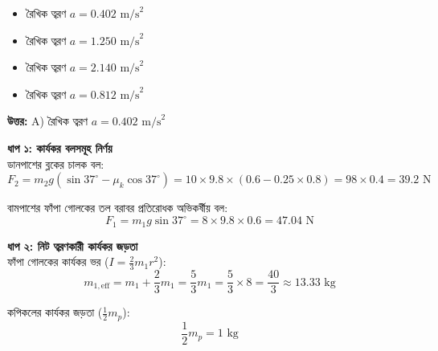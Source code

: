 \documentclass[12pt, a4paper]{article}
\begin{document}
{\begin{center}
\end{center}
\vspace{1em}

\begin{itemize}[label={}, leftmargin=1cm, itemsep=0.5em]
    \item[\textbf{A)}] রৈখিক ত্বরণ $a = 0.402\text{ m/s}^2$
    \item[\textbf{B)}] রৈখিক ত্বরণ $a = 1.250\text{ m/s}^2$
    \item[\textbf{C)}] রৈখিক ত্বরণ $a = 2.140\text{ m/s}^2$
    \item[\textbf{D)}] রৈখিক ত্বরণ $a = 0.812\text{ m/s}^2$
\end{itemize}

\vspace{0.5em}
\begin{tcolorbox}[answerbox]
    \textbf{\color{success} উত্তর:} A) রৈখিক ত্বরণ $a = 0.402\text{ m/s}^2$
\end{tcolorbox}
\vspace{1em}

\begin{tcolorbox}[solutionbox={সমাধান (Solution)}]
    \noindent
    \textbf{ধাপ ১: কার্যকর বলসমূহ নির্ণয়} \\
    ডানপাশের ব্লকের চালক বল:
    \[ F_2 = m_2 g (\sin 37^\circ - \mu_k \cos 37^\circ) = 10 \times 9.8 \times (0.6 - 0.25 \times 0.8) = 98 \times 0.4 = 39.2\text{ N} \]
    
    বামপাশের ফাঁপা গোলকের তল বরাবর প্রতিরোধক অভিকর্ষীয় বল:
    \[ F_1 = m_1 g \sin 37^\circ = 8 \times 9.8 \times 0.6 = 47.04\text{ N} \]
    
    \vspace{0.5em}
    \noindent\textbf{ধাপ ২: নিট ত্বরণকারী কার্যকর জড়তা} \\
    ফাঁপা গোলকের কার্যকর ভর ($I = \frac{2}{3} m_1 r^2$):
    \[ m_{1, \text{eff}} = m_1 + \frac{2}{3} m_1 = \frac{5}{3} m_1 = \frac{5}{3} \times 8 = \frac{40}{3} \approx 13.33\text{ kg} \]
    
    কপিকলের কার্যকর জড়তা ($\frac{1}{2} m_p$):
    \[ \frac{1}{2} m_p = 1\text{ kg} \]
    

\end{tcolorbox}}
\end{document}
